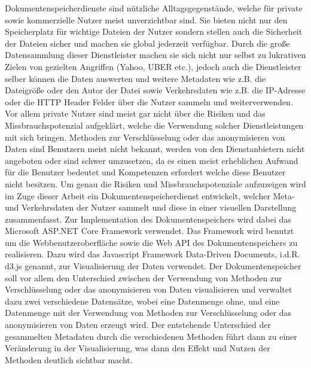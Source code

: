 \documentclass[
    fontsize=12pt,
    headings=small,
    parskip=half,           %
    bibliography=totoc,
    numbers=noenddot,       %
    open=any,               %
    ]{scrreprt}
\begin{document}
Dokumentenspeicherdienste sind nützliche Alltagsgegenstände, welche für private sowie kommerzielle Nutzer meist unverzichtbar sind. 
Sie bieten nicht nur den Speicherplatz für wichtige Dateien der Nutzer sondern stellen auch die Sicherheit der Dateien sicher und machen sie global jederzeit verfügbar. 
Durch die große Datensammlung dieser Dienstleister machen sie sich nicht nur selbst zu lukrativen Zielen von gezielten Angriffen (Yahoo, UBER etc.), jedoch auch die Dienstleister selber können die Daten auswerten und weitere Metadaten wie z.B. die Dateigröße oder den Autor der Datei sowie Verkehrsdaten wie z.B. die IP-Adresse oder die HTTP Header Felder über die Nutzer sammeln und weiterverwenden. 
Vor allem private Nutzer sind meist gar nicht über die Risiken und das Missbrauchspotenzial aufgeklärt, welche die Verwendung solcher Dienstleistungen mit sich bringen. 
Methoden zur Verschlüsselung oder das anonymisieren von Daten sind Benutzern meist nicht bekannt, werden von den Dienstanbietern nicht angeboten oder sind schwer umzusetzen, da es einen meist erheblichen Aufwand für die Benutzer bedeutet und Kompetenzen erfordert welche diese Benutzer nicht besitzen. 
Um genau die Risiken und Missbrauchspotenziale aufzuzeigen wird im Zuge dieser Arbeit ein Dokumentenspeicherdienst entwickelt, welcher Meta- und Verkehrsdaten der Nutzer sammelt und diese in einer visuellen Darstellung zusammenfasst. 
Zur Implementation des Dokumentenspeichers wird dabei das Microsoft ASP.NET Core Framework verwendet. 
Das Framework wird benutzt um die Webbenutzeroberfläche sowie die Web API des Dokumentenspeichers zu realisieren. 
Dazu wird das Javascript Framework Data-Driven Documents, i.d.R. d3.js genannt, zur Visualisierung der Daten verwendet. 
Der Dokumentenspeicher soll vor allem den Unterschied zwischen der Verwendung von Methoden zur Verschlüsselung oder das anonymisieren von Daten visualisieren und verwaltet dazu zwei verschiedene Datensätze, wobei eine Datenmenge ohne, und eine Datenmenge mit der Verwendung von Methoden zur Verschlüsselung oder das anonymisieren von Daten erzeugt wird. Der entstehende Unterschied der gesammelten Metadaten durch die verschiedenen Methoden führt dann zu einer Veränderung in der Visualisierung, was dann den Effekt und Nutzen der Methoden deutlich sichtbar macht.  

\end{document}
